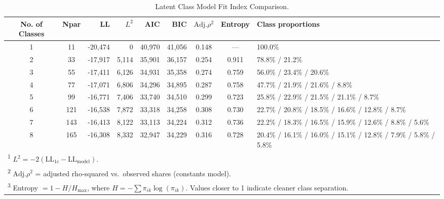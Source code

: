 \begin{table}[pos=H]
\selectfont
\caption{Latent Class Model Fit Index Comparison.}
\label{table:model_fit_comparison}
\begin{adjustbox}{width=\textwidth, center}

\begin{tabular}{ccrrrrccl}
\toprule
No. of Classes & Npar & LL & $L^2$ & AIC & BIC & $\text{Adj.}\rho^2$ & Entropy & Class proportions\\
\midrule
1 & 11 & -20,474 & 0 & 40,970 & 41,056 & 0.148 & --- & 100.0\%\\
2 & 33 & -17,917 & 5,114 & 35,901 & 36,157 & 0.254 & 0.911 & 78.8\% / 21.2\%\\
3 & 55 & -17,411 & 6,126 & 34,931 & 35,358 & 0.274 & 0.759 & 56.0\% / 23.4\% / 20.6\%\\
4 & 77 & -17,071 & 6,806 & 34,296 & 34,895 & 0.287 & 0.758 & 47.7\% / 21.9\% / 21.6\% / 8.8\%\\
5 & 99 & -16,771 & 7,406 & 33,740 & 34,510 & 0.299 & 0.723 & 25.8\% / 22.9\% / 21.5\% / 21.1\% / 8.7\%\\
6 & 121 & -16,538 & 7,872 & 33,318 & 34,258 & 0.308 & 0.730 & 22.7\% / 20.8\% / 18.5\% / 16.6\% / 12.8\% / 8.7\%\\
7 & 143 & -16,413 & 8,122 & 33,113 & 34,224 & 0.312 & 0.736 & 22.2\% / 18.3\% / 16.5\% / 15.9\% / 12.6\% / 8.8\% / 5.6\%\\
8 & 165 & -16,308 & 8,332 & 32,947 & 34,229 & 0.316 & 0.728 & 20.4\% / 16.1\% / 16.0\% / 15.1\% / 12.8\% / 7.9\% / 5.8\% / 5.8\%\\
\bottomrule
\multicolumn{9}{l}{\rule{0pt}{1em}\textsuperscript{1} $L^2 = -2(\text{LL}_{1c} - \text{LL}_{\text{model}})$.}\\
\multicolumn{9}{l}{\rule{0pt}{1em}\textsuperscript{2} $\text{Adj.}\rho^2$ = adjusted rho-squared vs.\ observed shares (constants model).}\\
\multicolumn{9}{l}{\rule{0pt}{1em}\textsuperscript{3} Entropy $= 1 - H/H_{\max}$, where $H = -\sum \pi_{ik}\log(\pi_{ik})$. Values closer to 1 indicate cleaner class separation.}\\
\end{tabular}
\end{adjustbox}
\end{table}

